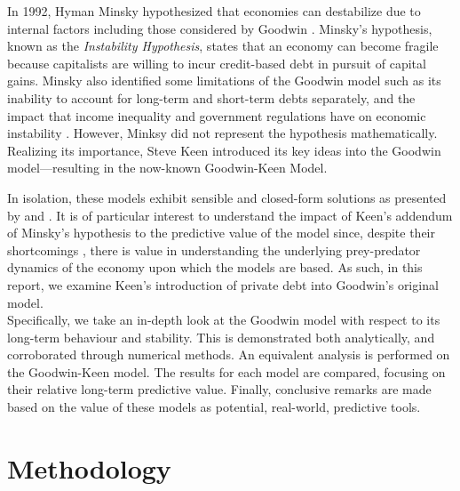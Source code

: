 \documentclass[12pt, centerh1]{article}
\begin{document}
In 1992, Hyman Minsky hypothesized that economies can destabilize due to internal factors including those considered by Goodwin \citep{minsky1992financial}. Minsky's hypothesis, known as the \emph{Instability Hypothesis}, states that an economy can become fragile because capitalists are willing to incur credit-based debt in pursuit of capital gains. Minsky also identified some limitations of the Goodwin model such as its inability to account for long-term and short-term debts separately, and the impact that income inequality and government regulations have on economic instability \citep{minsky1992financial}. However, Minksy did not represent the hypothesis mathematically. Realizing its importance, Steve Keen \citep{keen1995finance} introduced its key ideas into the Goodwin model––resulting in the now-known Goodwin-Keen Model. 

In isolation, these models exhibit sensible and closed-form solutions as presented by \citet{goodwin1982growth} and \citet{grasselli2012analysis}. It is of particular interest to understand the impact of Keen's addendum of Minsky's hypothesis to the predictive value of the model since, despite their shortcomings \citep{harvie2000testing, moura2013testing}, there is value in understanding the underlying prey-predator dynamics of the economy upon which the models are based. As such, in this report, we examine Keen's introduction of private debt into Goodwin's original model.\\

Specifically, we take an in-depth look at the Goodwin model with respect to its long-term behaviour and stability. This is demonstrated both analytically, and corroborated through numerical methods. An equivalent analysis is performed on the Goodwin-Keen model. The results for each model are compared, focusing on their relative long-term predictive value. Finally, conclusive remarks are made based on the value of these models as potential, real-world, predictive tools.


\section{Methodology}
\end{document}
